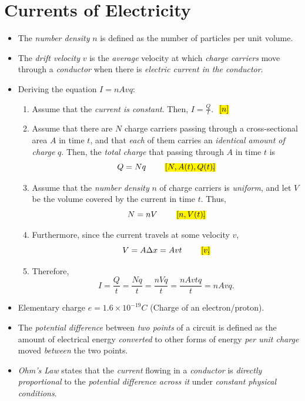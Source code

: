 \documentclass[oneside]{book}
\begin{document}
\chapter{Currents of Electricity}
\begin{itemize}
    \item The \emph{number density} \(n\) is defined as the number of particles per unit volume.
    \item The \emph{drift velocity} \(v\) is the \emph{average} velocity at which \emph{charge carriers} move through a \emph{conductor} when there is \emph{electric current in the conductor}.
    \item Deriving the equation \(I=nAvq\):
    \begin{enumerate}
        \item Assume that the \emph{current is constant}. Then, \(I=\frac{Q}{t}\).
        \hspace*{0pt}\hfill \(\highlight[yellow]{[n]}\)
        \item Assume that there are \(N\) charge carriers passing through a cross-sectional area \(A\) in time \(t\), and that \emph{each} of them carries an \emph{identical amount of charge} \(q\). Then, the \emph{total charge} that passing through \(A\) in time \(t\) is
        \[Q=Nq \tag*{\(\highlight[yellow]{[N,A(t),Q(t)]}\)}.\]
        \item Assume that the \emph{number density} \(n\) of charge carriers is \emph{uniform}, and let \(V\) be the volume covered by the current in time \(t\). Thus,
        \[N=nV \tag*{\(\highlight[yellow]{[n,V(t)]}\)}.\]
        \item Furthermore, since the current travels at some velocity \(v\),
        \[V=A\Delta x=Avt \tag*{\(\highlight[yellow]{[v]}\)}.\]
        \item Therefore, 
        \[I=\frac{Q}{t}=\frac{Nq}{t}=\frac{nVq}{t}=\frac{nAvtq}{t}=nAvq.\]
    \end{enumerate}
    \item Elementary charge \(e=1.6\times 10^{-19}C\) (Charge of an electron/proton).
    \item The \emph{potential difference} between \emph{two points} of a circuit is defined as the amount of electrical energy \emph{converted} to other forms of energy \emph{per unit charge} moved \emph{between} the two points. 
    \item \emph{Ohm's Law} states that the \emph{current} flowing in a \emph{conductor} is \emph{directly proportional} to the \emph{potential difference across it} under \emph{constant physical conditions}.

\end{itemize}
\end{document}
